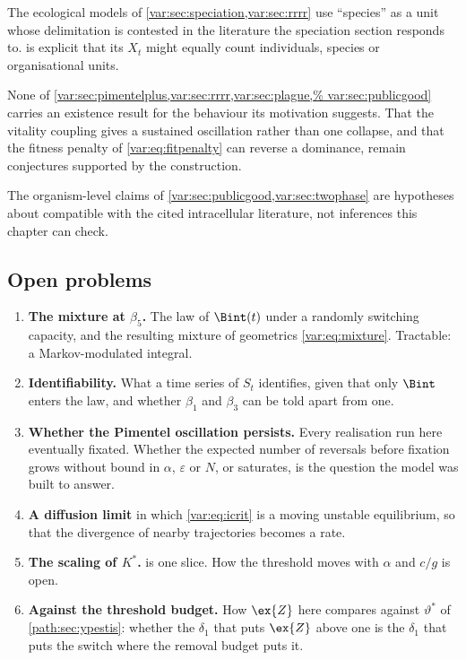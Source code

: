 The ecological models of \cref{var:sec:speciation,var:sec:rrrr} use
``species'' as a unit whose delimitation is contested in the literature the
speciation section responds to.  is explicit that its
$X_t$ might equally count individuals, species or organisational units.

None of \cref{var:sec:pimentelplus,var:sec:rrrr,var:sec:plague,%
var:sec:publicgood} carries an existence result for the behaviour its
motivation suggests. That the vitality coupling gives a sustained oscillation
rather than one collapse, and that the fitness penalty of
\cref{var:eq:fitpenalty} can reverse a dominance, remain conjectures
supported by the construction.

The organism-level claims of \cref{var:sec:publicgood,var:sec:twophase} are
hypotheses about \yp{} compatible with the cited intracellular literature,
not inferences this chapter can check.

\subsection{Open problems}
\label{var:sec:openproblems}

\begin{enumerate}[leftmargin=1.6em,itemsep=0.35em]
\item \textbf{The mixture at $\beta_5$.} The law of $\Bint(t)$ under a
randomly switching capacity, and the resulting mixture of geometrics
\cref{var:eq:mixture}. Tractable: a Markov-modulated integral.
\item \textbf{Identifiability.} What a time series of $S_t$ identifies,
given that only $\Bint$ enters the law, and whether $\beta_1$ and $\beta_3$
can be told apart from one.
\item \textbf{Whether the Pimentel oscillation persists.} Every realisation
run here eventually fixated. Whether the expected number of reversals before
fixation grows without bound in $\alpha$, $\varepsilon$ or $N$, or saturates,
is the question the model was built to answer.
\item \textbf{A diffusion limit} in which \cref{var:eq:icrit} is a moving
unstable equilibrium, so that the divergence of nearby trajectories becomes
a rate.
\item \textbf{The scaling of $K^\ast$.}  is one slice.
How the threshold moves with $\alpha$ and $c/g$ is open.
\item \textbf{Against the threshold budget.} How $\ex{Z}$ here compares
against $\vartheta^{\ast}$ of \cref{path:sec:ypestis}: whether the $\delta_1$
that puts $\ex{Z}$ above one is the $\delta_1$ that puts the switch where
the removal budget puts it.
\end{enumerate}

